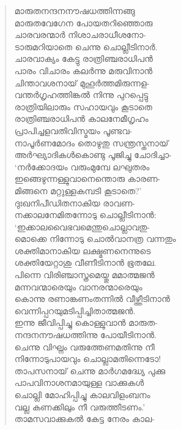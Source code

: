 \begin{verse}
മാരുതനന്ദനനൗഷധത്തിന്നങ്ങു\\
മാരുതവേഗേന പോയതറിഞ്ഞൊരു\\
ചാരവരന്മാര്‍ നിശാചരാധീശനോ-\\
ടാരുമറിയാതെ ചെന്നു ചൊല്ലീടിനാര്‍.\\
ചാരവാക്യം കേട്ടു രാത്രിഞ്ചരാധിപന്‍\\
പാരം വിചാരം കലര്‍ന്നു മരുവിനാന്‍\\
ചിന്താവശനായ് മുഹൂര്‍ത്തമിരുന്നള-\\
വന്തര്‍ഗൃഹത്തിങ്കല്‍ നിന്നു പുറപ്പെട്ടു\\
രാത്രിയിലാരും സഹായവും കൂടാതെ\\
രാത്രിഞ്ചരാധിപന്‍ കാലനേമീഗൃഹം\\
പ്രാപിച്ചളവതിവിസ്മയം പൂണ്ടവ-\\
നാപൂര്‍ണമോദം തൊഴുതു സന്ത്രസ്തനായ്\\
അര്‍ഘ്യാദികള്‍കൊണ്ടു പൂജിച്ചു ചോദിച്ചാ-\\
‘നര്‍ക്കോദയം വരുംമുമ്പേ ലഘുതരം\\
ഇങ്ങെഴുന്നള്ളുവാനെന്തൊരു കാരണ-\\
മിങ്ങനെ മറ്റുള്ളകമ്പടി കൂടാതെ?’\\
ദുഃഖനിപീഡിതനാകിയ രാവണ-\\
നക്കാലനേമിതന്നോടു ചൊല്ലീടിനാന്‍:\\
‘ഇക്കാലവൈഭവമെന്തുചൊല്ലാവതു-\\
മൊക്കെ നിന്നോടു ചൊല്‍വാനത്ര വന്നതും\\
ശക്തിമാനാകിയ ലക്ഷ്മണനെന്നുടെ\\
ശക്തിയേറ്റാശു വീണീടിനാന്‍ ഭൂതലേ.\\
പിന്നെ വിരിഞ്ചാസ്ത്രമെയ്തു മമാത്മജന്‍\\
മന്നവന്മാരെയും വാനരന്മാരെയും\\
കൊന്നു രണാങ്കണംതന്നില്‍ വീഴ്ത്തീടിനാന്‍\\
വെന്നിപ്പറയുമടിപ്പിച്ചിതാത്മജന്‍.\\
ഇന്നു ജീവിപ്പിച്ചു കൊള്ളുവാന്‍ മാരുത-\\
നന്ദനനൗഷധത്തിന്നു പോയീടിനാന്‍.\\
ചെന്നു വിഘ്നം വരുത്തേണമതിന്നു നീ\\
നിന്നോടുപായവും ചൊല്ലാമതിന്നെടോ!\\
താപസനായ് ചെന്നു മാര്‍ഗമദ്ധ്യേ പുക്കു\\
പാപവിനാശനമായുള്ള വാക്കുകള്‍\\
ചൊല്ലി മോഹിപ്പിച്ചു കാലവിളംബനം\\
വല്ല കണക്കിലും നീ വരുത്തീടണം.’\\
താമസവാക്കുകല്‍ കേട്ട നേരം കാല-\\

\end{verse}
